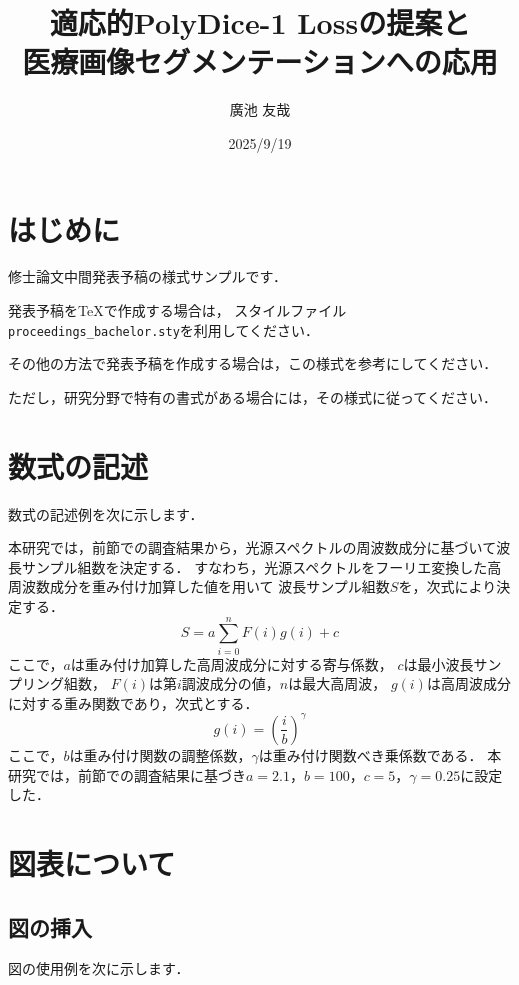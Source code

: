 \documentclass[10pt, a4paper, twocolumn]{jarticle}
\title{適応的PolyDice-1 Lossの提案と\\
医療画像セグメンテーションへの応用}
\author{廣池 友哉}
\affiliation{広島大学 大学院先進理工系科学研究科 情報科学プログラム}
\date{2025/9/19}
\begin{document}
\maketitle


\section{はじめに}
修士論文中間発表予稿の様式サンプルです．


発表予稿を\TeX{}で作成する場合は，
スタイルファイル\verb+proceedings_bachelor.sty+を利用してください．


その他の方法で発表予稿を作成する場合は，この様式を参考にしてください．


ただし，研究分野で特有の書式がある場合には，その様式に従ってください．


\section{数式の記述}
数式の記述例を次に示します．


本研究では，前節での調査結果から，光源スペクトルの周波数成分に基づいて波長サンプル組数を決定する．
すなわち，光源スペクトルをフーリエ変換した高周波数成分を重み付け加算した値を用いて
波長サンプル組数$S$を，次式により決定する．
%
\begin{equation}
S = a\sum_{i=0}^{n}F(i)g(i)+c
\end{equation}
%
ここで，$a$は重み付け加算した高周波成分に対する寄与係数，
$c$は最小波長サンプリング組数，
$F(i)$は第$i$調波成分の値，$n$は最大高周波，
$g(i)$は高周波成分に対する重み関数であり，次式とする．
%
\begin{equation}
g(i) = {\left(\frac{i}{b}\right)}^\gamma
\end{equation}
%
ここで，$b$は重み付け関数の調整係数，$\gamma$は重み付け関数べき乗係数である．
本研究では，前節での調査結果に基づき$a=2.1$，$b=100$，$c=5$，$\gamma=0.25$に設定した．
\newpage

\section{図表について}
\subsection{図の挿入}
図の使用例を次に示します．
\newline
\end{document}
